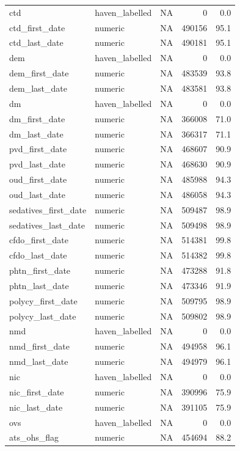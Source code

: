 \documentclass[
  11pt,
  letterpaper,
  DIV=11,
  numbers=noendperiod]{scrartcl}
\begin{document}
\begin{longtable*}{llrrr}
\addlinespace
ctd & haven\_labelled & NA & 0 & 0.0\\
ctd\_first\_date & numeric & NA & 490156 & 95.1\\
ctd\_last\_date & numeric & NA & 490181 & 95.1\\
dem & haven\_labelled & NA & 0 & 0.0\\
dem\_first\_date & numeric & NA & 483539 & 93.8\\
\addlinespace
dem\_last\_date & numeric & NA & 483581 & 93.8\\
dm & haven\_labelled & NA & 0 & 0.0\\
dm\_first\_date & numeric & NA & 366008 & 71.0\\
dm\_last\_date & numeric & NA & 366317 & 71.1\\
pvd\_first\_date & numeric & NA & 468607 & 90.9\\
\addlinespace
pvd\_last\_date & numeric & NA & 468630 & 90.9\\
oud\_first\_date & numeric & NA & 485988 & 94.3\\
oud\_last\_date & numeric & NA & 486058 & 94.3\\
sedatives\_first\_date & numeric & NA & 509487 & 98.9\\
sedatives\_last\_date & numeric & NA & 509498 & 98.9\\
\addlinespace
cfdo\_first\_date & numeric & NA & 514381 & 99.8\\
cfdo\_last\_date & numeric & NA & 514382 & 99.8\\
phtn\_first\_date & numeric & NA & 473288 & 91.8\\
phtn\_last\_date & numeric & NA & 473346 & 91.9\\
polycy\_first\_date & numeric & NA & 509795 & 98.9\\
\addlinespace
polycy\_last\_date & numeric & NA & 509802 & 98.9\\
nmd & haven\_labelled & NA & 0 & 0.0\\
nmd\_first\_date & numeric & NA & 494958 & 96.1\\
nmd\_last\_date & numeric & NA & 494979 & 96.1\\
nic & haven\_labelled & NA & 0 & 0.0\\
\addlinespace
nic\_first\_date & numeric & NA & 390996 & 75.9\\
nic\_last\_date & numeric & NA & 391105 & 75.9\\
ovs & haven\_labelled & NA & 0 & 0.0\\
ats\_ohs\_flag & numeric & NA & 454694 & 88.2\\

\end{longtable*}
\end{document}
